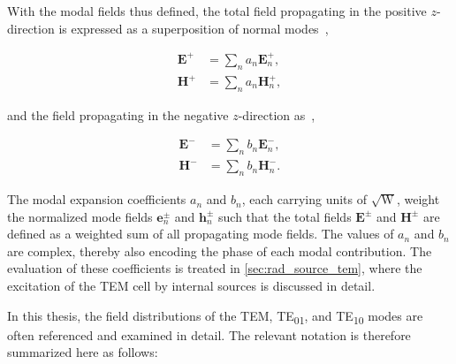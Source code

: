 With the modal fields thus defined, the total field propagating in the positive 
$z$-direction is expressed as a superposition of normal modes~\cite[p.~360]{Collin_2015},

\begin{subequations}
	\begin{align}
		\mathbf{E}^+ &= \sum_n a_n \mathbf{E}_n^+, \label{eqn:a_modal_superposition1}\\
		\mathbf{H}^+ &= \sum_n a_n \mathbf{H}_n^+, \label{eqn:a_modal_superposition2}
	\end{align}
\end{subequations}

and the field propagating in the negative $z$-direction as~\cite[p.~360]{Collin_2015},

\begin{subequations}
	\begin{align}
		\mathbf{E}^- &= \sum_n b_n \mathbf{E}_n^-, \label{eqn:b_modal_superposition1}\\
		\mathbf{H}^- &= \sum_n b_n \mathbf{H}_n^-. \label{eqn:b_modal_superposition2}
	\end{align}
\end{subequations}

The modal expansion coefficients $a_n$ and $b_n$, each carrying units of $\sqrt{\mathrm{W}}$, 
weight the normalized mode fields $\mathbf{e}_n^\pm$ and $\mathbf{h}_n^\pm$ such that the total fields $\mathbf{E}^\pm$ and $\mathbf{H}^\pm$ are defined as a weighted sum of all propagating mode fields. The values of $a_n$ and $b_n$ are complex, thereby also encoding the phase of each modal contribution. The evaluation of these coefficients is treated in \cref{sec:rad_source_tem}, where the excitation of the TEM cell by internal sources is discussed in detail.

In this thesis, the field distributions of the TEM, TE\textsubscript{01}, 
and TE\textsubscript{10} modes are often referenced and examined in detail. The relevant notation is therefore summarized here as follows:

